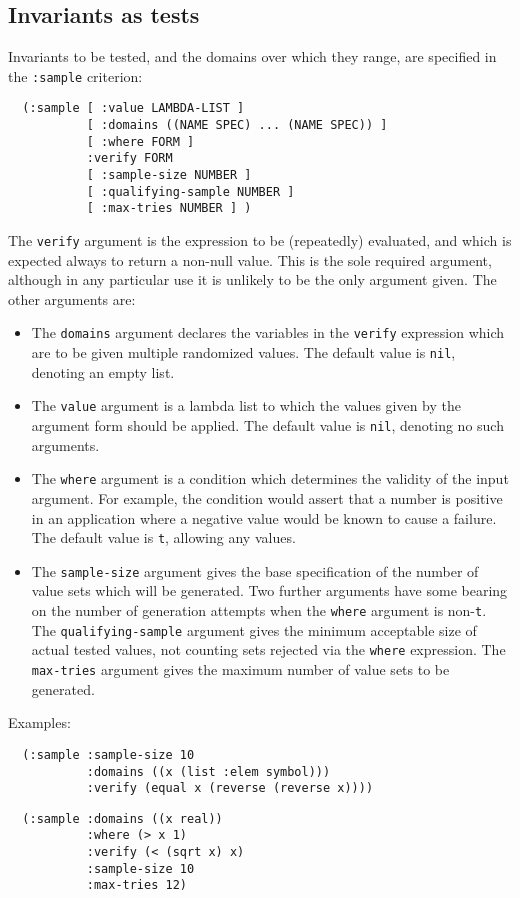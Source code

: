 \subsection{Invariants as tests}
\label{sec:quickcheck-tests}
Invariants to be tested, and the domains over which they range, are
specified in the \texttt{:sample} criterion:
\begin{verbatim}
  (:sample [ :value LAMBDA-LIST ]
           [ :domains ((NAME SPEC) ... (NAME SPEC)) ]
           [ :where FORM ]
           :verify FORM
           [ :sample-size NUMBER ]
           [ :qualifying-sample NUMBER ]
           [ :max-tries NUMBER ] )
\end{verbatim}
The \texttt{verify} argument is the expression to be (repeatedly)
evaluated, and which is expected always to return a non-null value.
This is the sole required argument, although in any particular use it
is unlikely to be the only argument given.  The other arguments are:
\begin{itemize}
\item The \texttt{domains} argument declares the variables in the
  \texttt{verify} expression which are to be given multiple randomized
  values.  The default value is \texttt{nil}, denoting an empty list.
\item The \texttt{value} argument is a lambda list to which the values
  given by the argument form should be applied.  The default value is
  \texttt{nil}, denoting no such arguments.
\item The \texttt{where} argument is a condition which determines the
  validity of the input argument.  For example, the condition would
  assert that a number is positive in an application where a negative
  value would be known to cause a failure.  The default value is
  \texttt{t}, allowing any values.
\item The \texttt{sample-size} argument gives the base specification
  of the number of value sets which will be generated.  Two further
  arguments have some bearing on the number of generation attempts
  when the \texttt{where} argument is non-\texttt{t}.  The
  \texttt{qualifying-sample} argument gives the minimum acceptable
  size of actual tested values, not counting sets rejected via the
  \texttt{where} expression.  The \texttt{max-tries} argument gives
  the maximum number of value sets to be generated.
\end{itemize}

Examples:
\begin{verbatim}
  (:sample :sample-size 10
           :domains ((x (list :elem symbol)))
           :verify (equal x (reverse (reverse x))))
\end{verbatim}

\begin{verbatim}
  (:sample :domains ((x real))
           :where (> x 1)
           :verify (< (sqrt x) x)
           :sample-size 10
           :max-tries 12)
\end{verbatim}

\begin{verbatim}

\end{verbatim}

